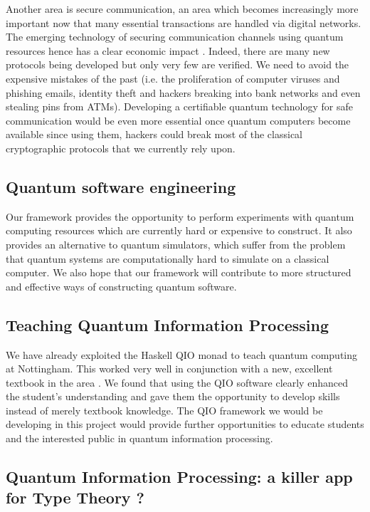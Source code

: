 \documentclass[a4paper]{article}
\begin{document}
Another area is secure communication, an area which becomes
increasingly more important now that many essential transactions are
handled via digital networks. The emerging technology of securing
communication channels using quantum resources hence has a clear
economic impact \cite{qci}. Indeed, there are many
new protocols being developed but only very few are verified. We need
to avoid the expensive mistakes of the past (i.e. the proliferation of
computer viruses and phishing emails, identity theft and hackers
breaking into bank networks and even stealing pins from ATMs).
Developing a certifiable quantum technology for safe communication
would be even more essential once quantum computers become available
since using them, hackers could break most of the classical
cryptographic protocols that we currently rely upon.

\subsection*{Quantum software engineering}
\label{sec:quant-softw-engin}

Our framework provides the opportunity to perform experiments with
quantum computing resources which are currently hard or expensive to
construct. It also provides an alternative to quantum simulators, which
suffer from the problem that quantum systems are computationally hard
to simulate on a classical computer. We also hope that our framework
will contribute to more structured and effective ways of constructing
quantum software. 

\subsection*{Teaching Quantum Information Processing}
\label{sec:teaching-qip}

We have already exploited the Haskell QIO monad to teach quantum
computing at Nottingham. This worked very well in conjunction with a
new, excellent textbook in the area \cite{Mermin}. We found that using
the QIO software clearly enhanced the student's understanding and gave
them the opportunity to develop skills instead of merely textbook
knowledge. The QIO framework we would be developing in
this project would provide further opportunities to educate students
and the interested public in quantum information processing. 

\subsection*{Quantum Information Processing: a killer app for Type Theory ?}
\label{sec:qip-killer-app}
\end{document}
